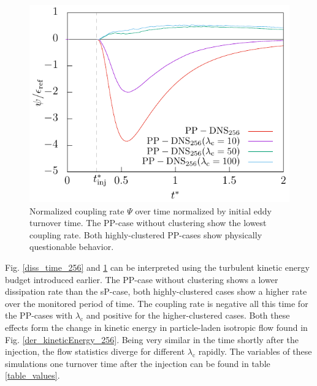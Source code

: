 \documentclass[11pt,a4paper,openany,oneside,parskip=half*]{article}
\begin{document}
\begin{figure}[h]
\begin{minipage}[t]{0.5\textwidth}
        \includegraphics[width=\linewidth]{./Abbildungen/256/coupling_time.pdf}
        \caption{Normalized coupling rate $\Psi$ over time normalized by initial eddy turnover time. The PP-case without clustering show the lowest coupling rate. Both highly-clustered PP-cases show physically questionable behavior.}
        \label{coupling_time_256}
    \end{minipage}
\end{figure}
\newline
Fig. \ref{diss_time_256} and \ref{coupling_time_256} can be interpreted using the turbulent kinetic energy budget introduced earlier. The PP-case without clustering shows a lower dissipation rate than the sP-case, both highly-clustered cases show a higher rate over the monitored period of time. The coupling rate is negative all this time for the PP-cases with $\lambda_\mathrm{c}$ and positive for the higher-clustered cases. Both these effects form the change in kinetic energy in particle-laden isotropic flow found in Fig. \ref{der_kineticEnergy_256}.
\newline
Being very similar in the time shortly after the injection, the flow statistics diverge for different $\lambda_\mathrm{c}$ rapidly. The variables of these simulations one turnover time after the injection can be found in table \ref{table_values}. 
\end{document}

